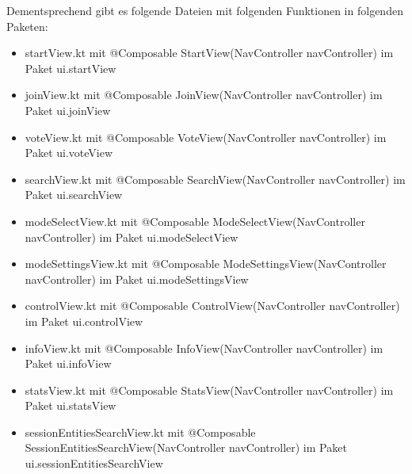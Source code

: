 \documentclass[oneside, ngerman]{sdqtechreport}
\begin{document}
Dementsprechend gibt es folgende Dateien mit folgenden Funktionen in folgenden Paketen:
\begin{itemize}
    \item startView.kt \newline mit @Composable StartView(NavController navController) \newline
    im Paket ui.startView
    \item joinView.kt \newline mit @Composable JoinView(NavController navController) \newline
    im Paket ui.joinView
    \item voteView.kt \newline mit @Composable VoteView(NavController navController) \newline
    im Paket ui.voteView
    \item searchView.kt \newline mit @Composable SearchView(NavController navController) \newline
    im Paket ui.searchView
    \item modeSelectView.kt \newline mit @Composable ModeSelectView(NavController navController) \newline
    im Paket ui.modeSelectView
    \item modeSettingsView.kt \newline mit @Composable ModeSettingsView(NavController navController) \newline
    im Paket ui.modeSettingsView
    \item controlView.kt \newline mit @Composable ControlView(NavController navController) \newline
    im Paket ui.controlView
    \item infoView.kt \newline mit @Composable InfoView(NavController navController) \newline
    im Paket ui.infoView
    \item statsView.kt \newline mit @Composable StatsView(NavController navController) \newline
    im Paket ui.statsView
    \item sessionEntitiesSearchView.kt \newline mit @Composable SessionEntitiesSearchView(NavController navController) \newline
    im Paket ui.sessionEntitiesSearchView
\end{itemize}
\end{document}
